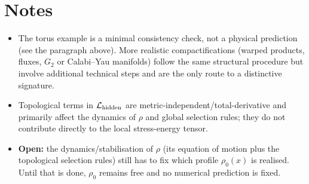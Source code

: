 \documentclass[11pt,a4paper]{article}
\begin{document}
\section{Notes}

\begin{itemize}
    \item The torus example is a minimal consistency check, not a physical
          prediction (see the paragraph above). More realistic compactifications
          (warped products, fluxes, \(G_2\) or Calabi--Yau manifolds) follow the
          same structural procedure but involve additional technical steps and
          are the only route to a distinctive signature.
    \item Topological terms in \(\mathcal{L}_{\rm hidden}\) are
          metric-independent/total-derivative and primarily affect the dynamics
          of \(\rho\) and global selection rules; they do not contribute
          directly to the local stress-energy tensor.
    \item \textbf{Open:} the dynamics/stabilisation of \(\rho\) (its equation of
          motion plus the topological selection rules) still has to fix which
          profile \(\rho_0(x)\) is realised. Until that is done, \(\rho_0\)
          remains free and no numerical prediction is fixed.
\end{itemize}
\end{document}
